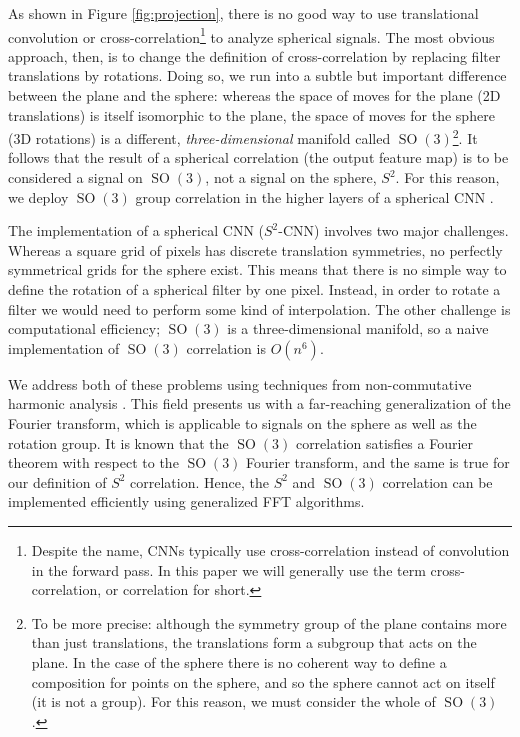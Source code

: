 \documentclass{article} %
\newcommand{\SO}[1]{\ensuremath{\operatorname{SO}(#1)}}
\begin{document}
As shown in Figure \ref{fig:projection}, there is no good way to use translational convolution or cross-correlation\footnote{Despite the name, CNNs typically use  cross-correlation instead of convolution in the forward pass. In this paper we will generally use the term cross-correlation, or correlation for short.} to analyze spherical signals.
The most obvious approach, then, is to change the definition of cross-correlation by replacing filter translations by rotations.
Doing so, we run into a subtle but important difference between the plane and the sphere: whereas the space of moves for the plane (2D translations) is itself isomorphic to the plane, the space of moves for the sphere (3D rotations) is a different, \emph{three-dimensional} manifold called $\SO3$\footnote{To be more precise: although the symmetry group of the plane contains more than just translations, the translations form a subgroup that acts on the plane.
In the case of the sphere there is no coherent way to define a composition for points on the sphere, and so the sphere cannot act on itself (it is not a group). For this reason, we must consider the whole of $\SO3$.}.
It follows that the result of a spherical correlation (the output feature map) is to be considered a signal on $\SO3$, not a signal on the sphere, $S^2$.
For this reason, we deploy $\SO3$ group correlation in the higher layers of a spherical CNN \citep{Cohen2016}.

The implementation of a spherical CNN ($S^2$-CNN) involves two major challenges.
Whereas a square grid of pixels has discrete translation symmetries, no perfectly symmetrical grids for the sphere exist.
This means that there is no simple way to define the rotation of a spherical filter by one pixel.
Instead, in order to rotate a filter we would need to perform some kind of interpolation.
The other challenge is computational efficiency; $\SO3$ is a three-dimensional manifold, so a naive implementation of $\SO3$ correlation is $O(n^6)$.

We address both of these problems using techniques from non-commutative harmonic analysis \citep{Chirikjian2001, Folland1995}.
This field presents us with a far-reaching generalization of the Fourier transform, which is applicable to signals on the sphere as well as the rotation group.
It is known that the $\SO3$ correlation satisfies a Fourier theorem with respect to the $\SO3$ Fourier transform, and the same is true for our definition of $S^2$ correlation.
Hence, the $S^2$ and $\SO3$ correlation can be implemented efficiently using generalized FFT algorithms.
\end{document}

